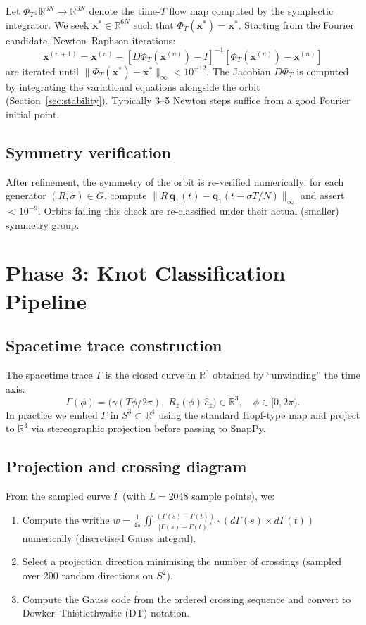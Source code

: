 \documentclass[12pt, a4paper]{article}
\theoremstyle{definition}
\newcommand{\R}{\mathbb{R}}
\newcommand{\bfq}{\mathbf{q}}
\begin{document}
Let $\Phi_T : \R^{6N} \to \R^{6N}$ denote the time-$T$ flow map computed by
the symplectic integrator.  We seek $\mathbf{x}^* \in \R^{6N}$ such that
$\Phi_T(\mathbf{x}^*) = \mathbf{x}^*$.  Starting from the Fourier candidate,
Newton--Raphson iterations:
\[
  \mathbf{x}^{(n+1)} = \mathbf{x}^{(n)}
  - \left[D\Phi_T(\mathbf{x}^{(n)}) - I\right]^{-1}
    \left[\Phi_T(\mathbf{x}^{(n)}) - \mathbf{x}^{(n)}\right]
\]
are iterated until $\|\Phi_T(\mathbf{x}^*) - \mathbf{x}^*\|_\infty < 10^{-12}$.
The Jacobian $D\Phi_T$ is computed by integrating the variational equations
alongside the orbit (Section~\ref{sec:stability}).  Typically 3--5 Newton
steps suffice from a good Fourier initial point.

\subsection{Symmetry verification}

After refinement, the symmetry of the orbit is re-verified numerically:
for each generator $(R, \sigma) \in G$, compute
$\|R\,\bfq_1(t) - \bfq_1(t - \sigma T/N)\|_\infty$ and assert $< 10^{-9}$.
Orbits failing this check are re-classified under their actual (smaller)
symmetry group.

\section{Phase 3: Knot Classification Pipeline}

\subsection{Spacetime trace construction}

The spacetime trace $\Gamma$ is the closed curve in $\R^3$ obtained by
``unwinding'' the time axis:
\[
  \Gamma(\phi) = \bigl(\gamma(T\phi/2\pi),\;
                  R_z(\phi)\,\hat{e}_z\bigr)
                 \in \R^3,
  \quad \phi \in [0, 2\pi).
\]
In practice we embed $\Gamma$ in $S^3 \subset \R^4$ using the standard
Hopf-type map and project to $\R^3$ via stereographic projection before
passing to SnapPy.

\subsection{Projection and crossing diagram}

From the sampled curve $\Gamma$ (with $L = 2048$ sample points), we:
\begin{enumerate}[leftmargin=1.8em]
  \item Compute the writhe $w = \frac{1}{4\pi}\iint \frac{(\Gamma(s) -
        \Gamma(t))}{|\Gamma(s) - \Gamma(t)|^3} \cdot (d\Gamma(s) \times
        d\Gamma(t))$ numerically (discretised Gauss integral).
  \item Select a projection direction minimising the number of crossings
        (sampled over 200 random directions on $S^2$).
  \item Compute the Gauss code from the ordered crossing sequence and
        convert to Dowker--Thistlethwaite (DT) notation.
\end{enumerate}
\end{document}

